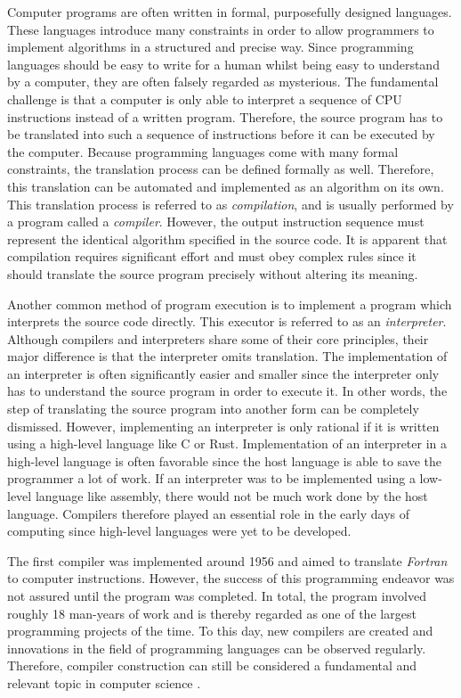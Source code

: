 Computer programs are often written in formal, purposefully designed languages.
These languages introduce many constraints in order to allow
programmers to implement algorithms in a structured and precise way.
Since programming languages should be easy to write for a human whilst being easy to understand by a computer,
they are often falsely regarded as mysterious.
The fundamental challenge is that a computer is only able to interpret a sequence of CPU instructions instead of a written program.
Therefore, the source program has to be translated into such a sequence of instructions before it can be executed by the computer.
Because programming languages come with many formal constraints, the translation process can be defined formally as well.
Therefore, this translation can be automated and implemented as an algorithm on its own.
This translation process is referred to as \emph{compilation}, and is usually performed by a program called a \emph{compiler}.
However, the output instruction sequence must represent the identical algorithm specified in the source code.
It is apparent that compilation requires significant effort and must obey complex rules
since it should translate the source program precisely without altering its meaning.

Another common method of program execution is to implement a program which interprets the source code directly.
This executor is referred to as an \emph{interpreter}.
Although compilers and interpreters share some of their core principles, their major difference is that the interpreter omits translation.
The implementation of an interpreter is often significantly easier and smaller since the interpreter only has to understand the source program in order to execute it.
In other words, the step of translating the source program into another form can be completely dismissed.
However, implementing an interpreter is only rational if it is written using a high-level language like C or Rust.
Implementation of an interpreter in a high-level language is often favorable since the host language is able to save the programmer a lot of work.
If an interpreter was to be implemented using a low-level language like assembly, there would not be much work done by the host language.
Compilers therefore played an essential role in the early days of computing since high-level languages were yet to be developed.

The first compiler was implemented around 1956 and aimed to translate \emph{Fortran} to computer instructions.
However, the success of this programming endeavor was not assured until the program was completed.
In total, the program involved roughly 18 man-years of work
and is thereby regarded as one of the largest programming projects of the time.
To this day, new compilers are created and innovations in the field of programming languages can be observed regularly.
Therefore, compiler construction can still be considered a fundamental and relevant topic in computer science
\cite[p.~6]{wirth_compiler_construction_2005}.
